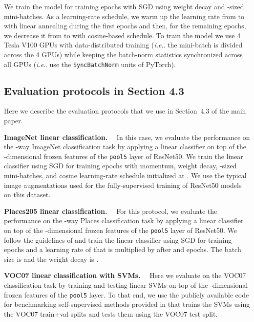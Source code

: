 \documentclass[final]{cvpr}
\makeatletter
\newcommand{\parag}[1]{\smallskip\noindent\textbf{#1}~~}
\newcommand{\resnetfifty}{ResNet50\xspace}
\DeclareRobustCommand\onedot{\futurelet\@let@token\@onedot}
\def\@onedot{\ifx\@let@token.\else.\null\fi\xspace}
\def\ie{\emph{i.e}\onedot} \def\Ie{\emph{I.e}\onedot}
\makeatother
\begin{document}
We train the model for  training epochs with SGD using 
weight decay and -sized mini-batches.
As a learning-rate schedule, we warm up the learning rate from  to  with linear annealing during the first  epochs and then, for the remaining  epochs, we decrease it from  to  with cosine-based schedule.  
To train the model we use 4 Tesla V100 GPUs with data-distributed training (\ie the mini-batch is divided across the 4 GPUs) while keeping the batch-norm statistics synchronized across all GPUs (\ie use the \texttt{SyncBatchNorm} units of PyTorch).

\subsection{Evaluation protocols in Section 4.3}

Here we describe the evaluation protocols that we use in Section~4.3 of the main paper.

\parag{ImageNet linear classification.}
In this case, 
we evaluate the performance on the -way ImageNet classification task by applying a linear classifier on top of the -dimensional frozen features of the \texttt{pool5} layer of \resnetfifty.
We train the linear classifier using SGD for  training epochs with  momentum,  weight decay, -sized mini-batches, and cosine learning-rate schedule initialized at .
We use the typical image augmentations used for the fully-supervised training of \resnetfifty models on this dataset.

\parag{Places205 linear classification.}
For this protocol, 
we evaluate the performance on the -way Places classification task by applying a linear classifier on top of the -dimensional frozen features of the \texttt{pool5} layer of \resnetfifty.
We follow the guidelines of \cite{goyal2019scaling} and train the linear classifier using SGD for  training epochs and a learning rate of  that is multiplied by  after  and  epochs.
The batch size is  and the weight decay is .

\parag{VOC07 linear classification with SVMs.}
Here we evaluate on the VOC07 classification task by training and testing linear SVMs on top of the -dimensional frozen features of the \texttt{pool5} layer.
To that end, we use the publicly available code for benchmarking self-supervised methods provided in \cite{goyal2019scaling} that trains the SVMs using the VOC07 train+val splits and tests them using the VOC07 test split. 
\end{document}
